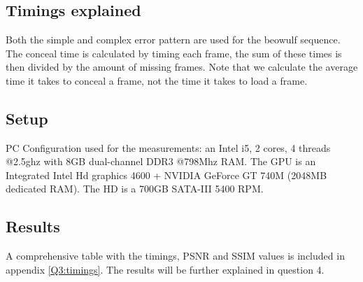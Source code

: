 \section[The results of all quality and time measurements (provide information about the
PC configuration used in order to put the time measurements in context).]{}

\subsection{Timings explained}
Both the simple and complex error pattern are used for the beowulf sequence.
The conceal time is calculated by timing each frame, the sum of these times is then divided by the amount of missing frames. Note that we calculate the average time it takes to conceal a frame, not the time it takes to load a frame.

\subsection{Setup}
PC Configuration used for the measurements: an Intel i5, 2 cores, 4 threads @2.5ghz with 8GB dual-channel DDR3 @798Mhz RAM. The GPU is an Integrated Intel Hd graphics 4600 + NVIDIA GeForce GT 740M (2048MB dedicated RAM). The HD is a 700GB SATA-III 5400 RPM.

\subsection{Results}
A comprehensive table with the timings, PSNR and SSIM values is included in appendix \ref{Q3:timings}. The results will be further explained in question 4.
